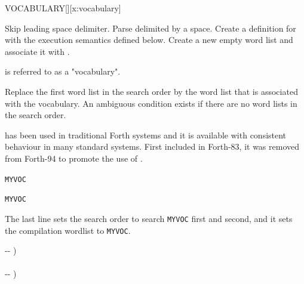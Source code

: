 \begin{worddef*}{}{VOCABULARY}[][x:vocabulary]
\item {}

	Skip leading space delimiter. Parse  delimited by a space.
	Create a definition for  with the execution semantics defined
	below. Create a new empty word list  and associate it with
	.

	 is referred to as a "vocabulary".

\item[\param{name} Execution:]
	\stack{}{}

	Replace the first word list in the search order by the word list 
	that is associated with the  vocabulary. An ambiguous condition
	exists if there are no word lists in the search order.


	\begin{rationale}
		 has been used in traditional Forth systems and it is
		available with consistent behaviour in many standard systems. First included
		in Forth-83, it was removed from Forth-94 to promote the use of
		.

	\item[Typical use]
		 \texttt{MYVOC}

		   \texttt{MYVOC} 

                The last line sets the search order to search
                \texttt{MYVOC} first and  second, and it
                sets the compilation wordlist to \texttt{MYVOC}.
	\end{rationale}

	\begin{implement}
		\word{:}   -{}- ) \\
		\tab {}  \word{,} \\
		\tab {}  -{}- ) \\
		\tab[2]      \\
		\tab[2]    \\
		\word{;}
	\end{implement}
\end{worddef*}
